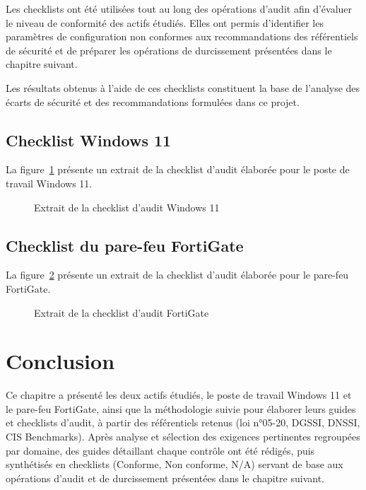 Les checklists ont été utilisées tout au long des opérations d'audit afin d'évaluer le niveau de conformité des actifs étudiés. Elles ont permis d'identifier les paramètres de configuration non conformes aux recommandations des référentiels de sécurité et de préparer les opérations de durcissement présentées dans le chapitre suivant.

Les résultats obtenus à l'aide de ces checklists constituent la base de l'analyse des écarts de sécurité et des recommandations formulées dans ce projet.

\subsection{Checklist Windows 11}

La figure~\ref{fig:check-win} présente un extrait de la checklist d'audit élaborée pour le poste de travail Windows 11.

\begin{figure}[htbp]
\centering
{}
\caption{Extrait de la checklist d'audit Windows 11}
\label{fig:check-win}
\end{figure}

\subsection{Checklist du pare-feu FortiGate}

La figure~\ref{fig:check-forti} présente un extrait de la checklist d'audit élaborée pour le pare-feu FortiGate.

\begin{figure}[htbp]
\centering
{}
\caption{Extrait de la checklist d'audit FortiGate}
\label{fig:check-forti}
\end{figure}

\section{Conclusion}

Ce chapitre a présenté les deux actifs étudiés, le poste de travail Windows 11 et le pare-feu FortiGate, ainsi que la méthodologie suivie pour élaborer leurs guides et checklists d'audit, à partir des référentiels retenus (loi n°05-20, DGSSI, DNSSI, CIS Benchmarks). Après analyse et sélection des exigences pertinentes regroupées par domaine, des guides détaillant chaque contrôle ont été rédigés, puis synthétisés en checklists (Conforme, Non conforme, N/A) servant de base aux opérations d'audit et de durcissement présentées dans le chapitre suivant.
